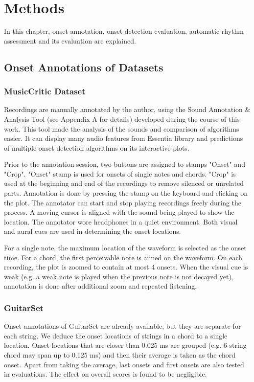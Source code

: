 \chapter{Methods}

In this chapter, onset annotation, onset detection evaluation, automatic rhythm assessment and its evaluation are explained. 

\section{Onset Annotations of Datasets}

\subsection{MusicCritic Dataset}\label{mc_annot}
Recordings are manually annotated by the author, using the Sound Annotation & Analysis Tool (see Appendix A for details) developed during the course of this work. This tool made the analysis of the sounds and comparison of algorithms easier. It can display many audio features from Essentia \cite{essentia} library and predictions of multiple onset detection algorithms on its interactive plots.

Prior to the annotation session, two buttons are assigned to stamps "Onset" and "Crop". "Onset" stamp is used for onsets of single notes and chords. "Crop" is used at the beginning and end of the recordings to remove silenced or unrelated parts. Annotation is done by pressing the stamp on the keyboard and clicking on the plot. The annotator can start and stop playing recordings freely during the process. A moving cursor is aligned with the sound being played to show the location. The annotator wore headphones in a quiet environment. Both visual and aural cues are used in determining the onset locations.  

For a single note, the maximum location of the waveform is selected as the onset time. For a chord, the first perceivable note is aimed on the waveform. On each recording, the plot is zoomed to contain at most 4 onsets. When the visual cue is weak (e.g. a weak note is played when the previous note is not decayed yet), annotation is done after additional zoom and repeated listening.

\subsection{GuitarSet}
Onset annotations of GuitarSet are already available, but they are separate for each string. We deduce the onset locations of strings in a chord to a single location. Onset locations that are closer than 0.025 ms are grouped (e.g. 6 string chord may span up to 0.125 ms) and then their average is taken as the chord onset. Apart from taking the average, last onsets and first onsets are also tested in evaluations. The effect on overall scores is found to be negligible.

